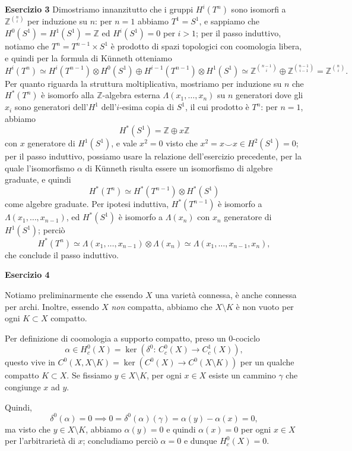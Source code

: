 \documentclass[a4paper]{article}
\newcommand{\Z}{\mathbb{Z}}
\theoremstyle{definition}
\theoremstyle{definition}
\theoremstyle{remark}
\theoremstyle{definition}
\begin{document}
\textbf{Esercizio 3}
Dimostriamo innanzitutto che i gruppi $H^i(T^n)$ sono isomorfi a $\Z^{\binom{n}{i}}$ per induzione su $n$: per $n=1$ abbiamo $T^1=S^1$, e sappiamo che $H^0(S^1)=H^1(S^1)=\Z$ ed
$H^i(S^1)=0$ per $i>1$; per il passo induttivo, notiamo che $T^n=T^{n-1}\times S^1$ è prodotto di spazi topologici con coomologia libera, e quindi per la formula di Künneth
otteniamo
\[
    H^i(T^n) \simeq H^i(T^{n-1})\otimes H^0(S^1) \oplus H^{i-1}(T^{n-1})\otimes H^1(S^1) \simeq \Z^{\binom{n-1}{i}}\oplus\Z^{\binom{n-1}{i-1}} = \Z^{\binom{n}{i}}
.\]
Per quanto riguarda la struttura moltiplicativa, mostriamo per induzione su $n$ che $H^*(T^n)$ è isomorfo alla $\Z$-algebra esterna $\Lambda(x_1,\ldots,x_n)$ su $n$ generatori dove
gli $x_i$ sono generatori dell'$H^1$ dell'$i$-esima copia di $S^1$, il cui prodotto è $T^n$: per
$n=1$, abbiamo $$H^*(S^1)=\Z \oplus x\Z$$ con $x$ generatore di $H^1(S^1)$, e vale $x^2=0$ visto che $x^2=x\smile x \in H^2(S^1)=0$; per il passo induttivo, possiamo usare la
relazione dell'esercizio precedente, per la quale l'isomorfismo $\alpha$ di Künneth risulta essere un isomorfismo di algebre graduate, e quindi
\[
    H^*(T^n)\simeq H^*(T^{n-1})\otimes H^*(S^1)
\]
come algebre graduate.
Per ipotesi induttiva, $H^*(T^{n-1})$ è isomorfo a $\Lambda(x_1,\ldots,x_{n-1})$, ed $H^*(S^1)$ è isomorfo a $\Lambda(x_n)$ con $x_n$ generatore di $H^1(S^1)$; perciò
\[
    H^*(T^n)\simeq \Lambda(x_1,\ldots,x_{n-1})\otimes\Lambda(x_n)\simeq \Lambda(x_1,\ldots,x_{n-1},x_n)
,\]
che conclude il passo induttivo.

\textbf{Esercizio 4}

Notiamo preliminarmente che essendo $X$ una varietà connessa, è anche connessa per archi. Inoltre, essendo $X$ \textit{non} compatta, abbiamo che $X\setminus K$ è non vuoto per ogni $K\subset X$ compatto.

Per definizione di coomologia a supporto compatto, preso un $0$-cociclo
\[
    \alpha\in H^0_c(X)=\ker{(\delta^0:\,C^0_c(X)\to C^1_c(X))}
,\]
questo vive in $C^0(X,X\setminus K )=\ker(C^0(X)\to C^0(X\setminus K))$ per un qualche compatto $K\subset X$. Se fissiamo $y\in X\setminus K$, per ogni $x\in X$ esiste un cammino $\gamma$ che congiunge
$x$ ad $y$.

Quindi,
\[
    \delta^0(\alpha)=0 \implies 0=\delta^0(\alpha)(\gamma)=\alpha(y)-\alpha(x)=0,
\] ma visto che $y\in X\setminus K$, abbiamo $\alpha(y)=0$ e quindi $\alpha(x)=0$ per ogni $x\in X$ per l'arbitrarietà di $x$; concludiamo perciò $\alpha=0$ e dunque $H^0_c(X)=0$.
\end{document}
